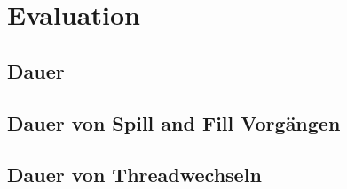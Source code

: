 \chapter{Evaluation}
\label{cha:Evaluation}
\section{Dauer }
\section{Dauer von Spill and Fill Vorgängen}
\section{Dauer von Threadwechseln}